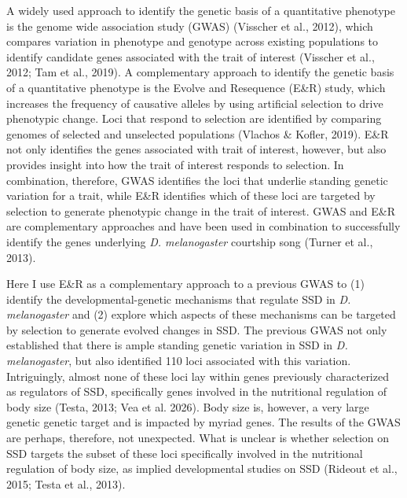 \documentclass[12pt,reqno,oneside]{report}
\begin{document}
A widely used approach to identify the genetic basis of a quantitative phenotype is the genome wide association study (GWAS) (Visscher et al., 2012), which compares variation in phenotype and genotype across existing populations to identify candidate genes associated with the trait of interest (Visscher et al., 2012; Tam et al., 2019). A complementary approach to identify the genetic basis of a quantitative phenotype is the Evolve and Resequence (E\&R) study, which increases the frequency of causative alleles by using artificial selection to drive phenotypic change. Loci that respond to selection are identified by comparing genomes of selected and unselected populations (Vlachos \& Kofler, 2019). E\&R not only identifies the genes associated with trait of interest, however, but also provides insight into how the trait of interest responds to selection. In combination, therefore, GWAS identifies the loci that underlie standing genetic variation for a trait, while E\&R identifies which of these loci are targeted by selection to generate phenotypic change in the trait of interest. GWAS and E\&R are complementary approaches and have been used in combination to successfully identify the genes underlying \textit{D. melanogaster} courtship song (Turner et al., 2013).

Here I use E\&R as a complementary approach to a previous GWAS to (1) identify the developmental-genetic mechanisms that regulate SSD in \textit{D. melanogaster} and (2) explore which aspects of these mechanisms can be targeted by selection to generate evolved changes in SSD. The previous GWAS not only established that there is ample standing genetic variation in SSD in \textit{D. melanogaster}, but also identified 110 loci associated with this variation. Intriguingly, almost none of these loci lay within genes previously characterized as regulators of SSD, specifically genes involved in the nutritional regulation of body size (Testa, 2013; Vea et al. 2026). Body size is, however, a very large genetic genetic target and is impacted by myriad genes. The results of the GWAS are perhaps, therefore, not unexpected. What is unclear is whether selection on SSD  targets the subset of these loci specifically involved in the nutritional regulation of body size, as implied developmental studies on SSD (Rideout et al., 2015; Testa et al., 2013). 
\end{document}
